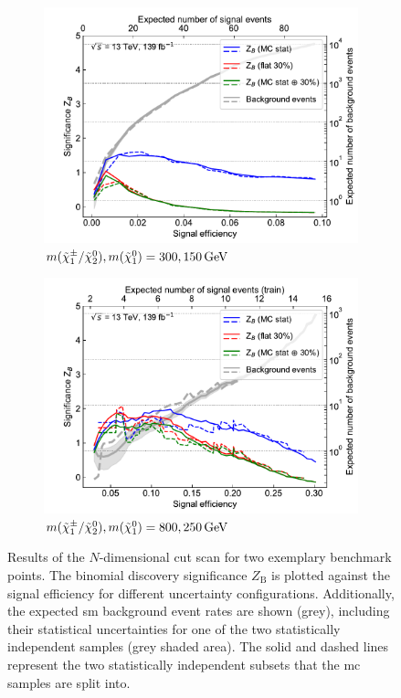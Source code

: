 \begin{figure}
	\centering
	\begin{subfigure}[b]{0.5\linewidth}
		\centering\includegraphics[width=1.0\textwidth]{N-1_cut_scan/z_vs_effs_300_150.pdf}
		\caption{$m(\charg/\neutr), m(\lsp) =  300, \SI{150}{\GeV}$}
	\end{subfigure}\hfill
	\begin{subfigure}[b]{0.5\linewidth}
		\centering\includegraphics[width=1.0\textwidth]{N-1_cut_scan/z_vs_effs_800_250.pdf}
		\caption{$m(\charg/\neutr), m(\lsp) =  800, \SI{250}{\GeV}$}
	\end{subfigure}\hfill

	\caption[N-dimensional cut scan results]{Results of the $N$-dimensional cut scan for two exemplary benchmark points. The binomial discovery significance $Z_\mathrm{B}$ is plotted against the signal efficiency for different uncertainty configurations. Additionally, the expected \gls{sm} background event rates are shown (grey), including their statistical uncertainties for one of the two statistically independent samples (grey shaded area). The solid and dashed lines represent the two statistically independent subsets that the \gls{mc} samples are split into.}
	\label{fig:results_z_vs_eff}
\end{figure}

